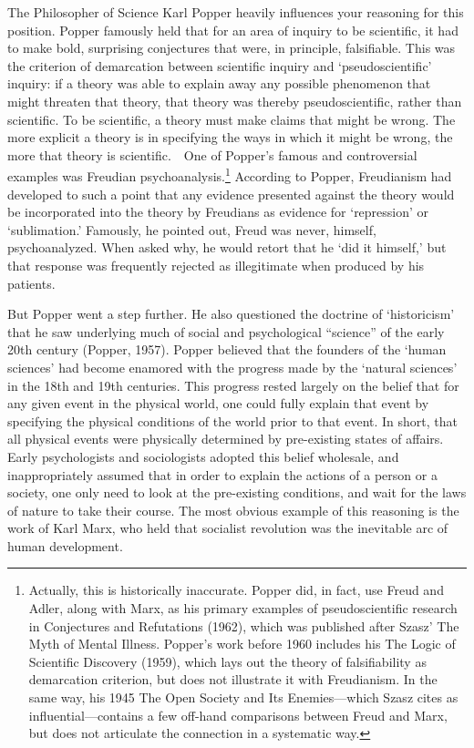 The Philosopher of Science Karl Popper heavily influences your reasoning for this position. Popper famously held that for an area of inquiry to be scientific, it had to make bold, surprising conjectures that were, in principle, falsifiable. This was the criterion of demarcation between scientific inquiry and `pseudoscientific' inquiry: if a theory was able to explain away any possible phenomenon that might threaten that theory, that theory was thereby pseudoscientific, rather than scientific. To be scientific, a theory must make claims that might be wrong. The more explicit a theory is in specifying the ways in which it might be wrong, the more that theory is scientific.
  One of Popper's famous and controversial examples was Freudian psychoanalysis.\footnote{Actually, this is historically inaccurate. Popper did, in fact, use Freud and Adler, along with Marx, as his primary examples of pseudoscientific research in Conjectures and Refutations (1962), which was published after Szasz' The Myth of Mental Illness. Popper's work before 1960 includes his The Logic of Scientific Discovery (1959), which lays out the theory of falsifiability as demarcation criterion, but does not illustrate it with Freudianism. In the same way, his 1945 The Open Society and Its Enemies---which Szasz cites as influential---contains a few off-hand comparisons between Freud and Marx, but does not articulate the connection in a systematic way.} According to Popper, Freudianism had developed to such a point that any evidence presented against the theory would be incorporated into the theory by Freudians as evidence for `repression' or `sublimation.' Famously, he pointed out, Freud was never, himself, psychoanalyzed. When asked why, he would retort that he `did it himself,' but that response was frequently rejected as illegitimate when produced by his patients.

But Popper went a step further. He also questioned the doctrine of `historicism' that he saw underlying much of social and psychological ``science'' of the early 20th century (Popper, 1957). Popper believed that the founders of the `human sciences' had become enamored with the progress made by the `natural sciences' in the 18th and 19th centuries. This progress rested largely on the belief that for any given event in the physical world, one could fully explain that event by specifying the physical conditions of the world prior to that event. In short, that all physical events were physically determined by pre-existing states of affairs. Early psychologists and sociologists adopted this belief wholesale, and inappropriately assumed that in order to explain the actions of a person or a society, one only need to look at the pre-existing conditions, and wait for the laws of nature to take their course. The most obvious example of this reasoning is the work of Karl Marx, who held that socialist revolution was the inevitable arc of human development. 


